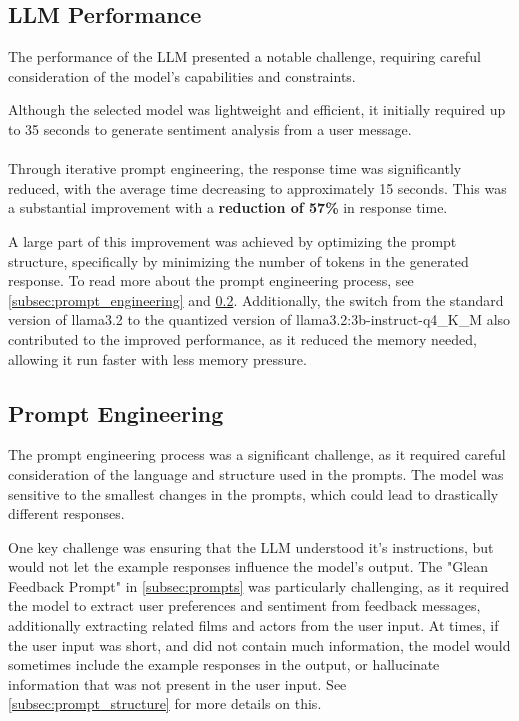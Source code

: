 \subsection{LLM Performance}
\label{subsec:llm_performance_challenges}
The performance of the LLM presented a notable challenge, requiring careful consideration of the model's capabilities and constraints.

Although the selected model was lightweight and efficient, it initially required up to 35 seconds to generate sentiment analysis from a user message. 
\\\\
Through iterative prompt engineering, the response time was significantly reduced, with the average time decreasing to approximately 15 seconds. This was a substantial improvement with a \textbf{reduction of 57\%} in response time.

A large part of this improvement was achieved by optimizing the prompt structure, specifically by minimizing the number of tokens in the generated response. To read more about the prompt engineering process, see \cref{subsec:prompt_engineering} and \cref{subsec:prompt_engineering_challenges}.
Additionally, the switch from the standard version of llama3.2 to the quantized version of llama3.2:3b-instruct-q4\_K\_M also contributed to the improved performance, as it reduced the memory needed, allowing it run faster with less memory pressure.

\subsection{Prompt Engineering}
\label{subsec:prompt_engineering_challenges}
The prompt engineering process was a significant challenge, as it required careful consideration of the language and structure used in the prompts.
The model was sensitive to the smallest changes in the prompts, which could lead to drastically different responses.

One key challenge was ensuring that the LLM understood it's instructions, but would not let the example responses influence the model's output.
The "Glean Feedback Prompt" in \cref{subsec:prompts} was particularly challenging, as it required the model to extract user preferences and sentiment from feedback messages, additionally extracting related films and actors from the user input.
At times, if the user input was short, and did not contain much information, the model would sometimes include the example responses in the output, or hallucinate information that was not present in the user input. See \cref{subsec:prompt_structure} for more details on this.

